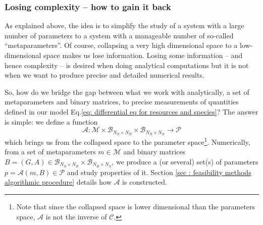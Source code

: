 \documentclass[12pt, titlepage]{report}
\begin{document}
\subsubsection{Losing complexity -- how to gain it back}
As explained above, the idea is to simplify the study of a system with a large number of parameters to a system with a manageable number of so-called ``metaparameters''. Of course, collapsing a very high dimensional space to a low-dimensional space makes us lose information. Losing some information -- and hence complexity -- is desired when doing analytical computations but it is not when we want to produce precise and detailed numerical results.

So, how do we bridge the gap between what we work with analytically, \ie a set of metaparameters and binary matrices, to precise measurements of quantities defined in our model Eq.\eqref{eq: differential eq for resources and species}? The answer is simple: we define a function
\begin{equation}
\mathcal{A}: \mathcal{M} \times \mathcal{B}_{N_S\times N_R} \times \mathcal{B}_{N_R \times N_S} \rightarrow \mathcal{P}
\end{equation}
which brings us from the collapsed space to the parameter space\footnote{Note that since the collapsed space is lower dimensional than the parameters space, $\mathcal{A}$ is not the inverse of $\mathcal{C}$.}. Numerically, from a set of metaparameters $m \in \mathcal{M}$ and binary matrices $B=(G, A) \in \mathcal{B}_{N_S \times N_R} \times \mathcal{B}_{N_R \times N_S}$, we produce a (or several) set(s) of parameters $p = \mathcal{A}(m, B) \in \mathcal{P}$ and study properties of it. Section \ref{sec : feasibility methods algorithmic procedure} details how $\mathcal{A}$ is constructed.
\end{document}
